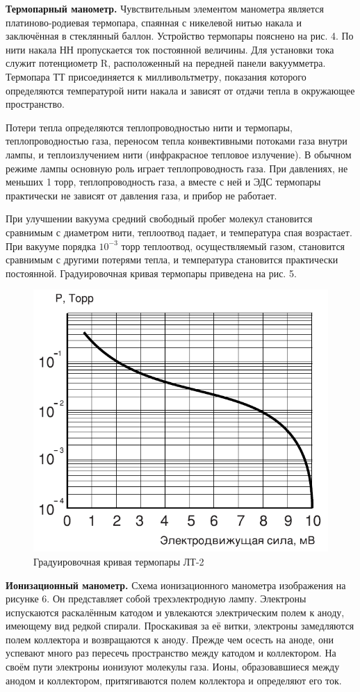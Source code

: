 \documentclass[a4paper,12pt]{article} %
\begin{document}
\medskip
 
\noindent \textbf{Термопарный манометр.} Чувствительным элементом манометра является платиново-родиевая термопара, спаянная с никелевой нитью накала и заключённая в стеклянный баллон. Устройство термопары пояснено на рис. 4. По нити накала НН пропускается ток постоянной величины. Для установки тока служит потенциометр R, расположенный на передней панели вакуумметра. Термопара ТТ присоединяется к милливольтметру, показания которого определяются температурой нити накала и зависят от отдачи тепла в окружающее пространство.

\medskip

\noindent Потери тепла определяются теплопроводностью нити и термопары, теплопроводностью газа, переносом тепла конвективными потоками газа внутри лампы, и теплоизлучением нити (инфракрасное тепловое излучение). В обычном режиме лампы основную роль играет теплопроводность газа. При давлениях, не меньших 1 торр, теплопроводность газа, а вместе с ней и ЭДС термопары практически не зависят от давления газа, и прибор не работает.

\medskip

\noindent При улучшении вакуума средний свободный пробег молекул становится сравнимым с диаметром нити, теплоотвод падает, и температура спая возрастает. При вакууме порядка $10^{-3}$ торр теплоотвод, осуществляемый газом, становится сравнимым с другими потерями тепла, и температура становится практически постоянной. Градуировочная кривая термопары приведена на рис. 5.


 \begin{figure}[!h]
 	\centering
 	\includegraphics[width=0.4\linewidth]{градуировочная кривая.png}
 	\caption[]{Градуировочная кривая термопары ЛТ-2}
 	
 \end{figure}

		
\noindent \textbf{Ионизационный манометр.} Схема ионизационного манометра изображения на рисунке 6. Он представляет собой трехэлектродную лампу. Электроны испускаются раскалённым катодом и увлекаются электрическим полем к аноду, имеющему вид редкой спирали. Проскакивая за её витки, электроны замедляются полем коллектора и возвращаются к аноду. Прежде чем осесть на аноде, они успевают много раз пересечь пространство между катодом и коллектором. На своём пути электроны ионизуют молекулы газа. Ионы, образовавшиеся между анодом и коллектором, притягиваются полем коллектора и определяют его ток.
\end{document}

